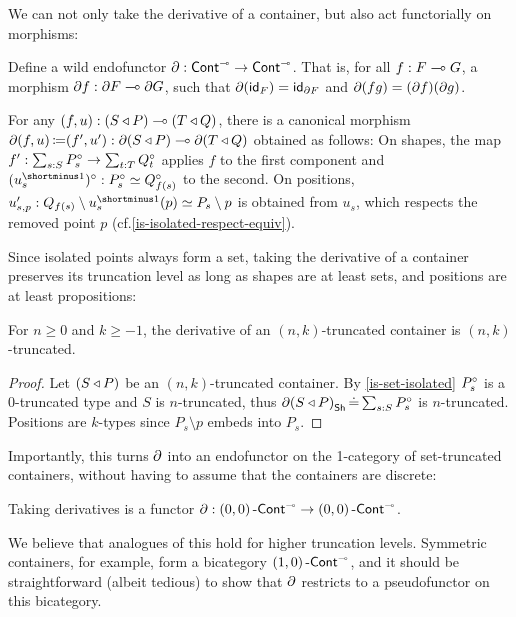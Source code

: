 We can not only take the derivative of a container, but also act functorially on morphisms:
\begin{problem}
  Define a wild endofunctor \( \partial : \operatorname{\operatorname{\mathsf{Cont}}}^{{\scriptscriptstyle\multimap}} \to \operatorname{\operatorname{\mathsf{Cont}}}^{{\scriptscriptstyle\multimap}} \).
  That is,
  for all \( f : F\mathrel{\multimap}G \), a morphism \( \partial{f} : \partial{F}\mathrel{\multimap}\partial{G} \),
  such that \( \partial(\operatorname{\mathsf{id}}_F) = \operatorname{\mathsf{id}}_{\partial{F}} \) and \(\partial(fg) = (\partial{f})(\partial{g}) \).
  \begin{construction}
    For any \( (f, u) : (S\mathbin{\triangleleft}P)\mathrel{\multimap}(T\mathbin{\triangleleft}Q) \),
    there is a canonical morphism \( \partial{(f, u)} \operatorname{\mathrel{\coloneq}} (f' , u') : \partial{(S\mathbin{\triangleleft}P)}\mathrel{\multimap}\partial{(T\mathbin{\triangleleft}Q)} \)
    obtained as follows:
    On shapes, the map \( f' : \sum_{s : S} P_s^{\circ} \to \sum_{t : T} Q_t^{\circ} \)
    applies \( f \) to the first component and \( \Isolated{(u_s^\Inv)} : \Isolated{P_s} \simeq \Isolated{Q_{f(s)}} \) to the second.
    On positions, \( u'_{s,p} : Q_{f(s)} \setminus u_s^\Inv(p) \simeq P_s \setminus p \) is obtained from \( u_s \), which respects the removed point \( p \)
    (cf.\@ \autoref{is-isolated-respect-equiv}).
  \end{construction}
\end{problem}

Since isolated points always form a set, taking the derivative of a container preserves its truncation level
as long as shapes are at least sets, and positions are at least propositions:
\begin{proposition}
  For \( n \geq 0 \) and \( k \geq -1 \), the derivative of an \( (n, k) \)-truncated container is \( (n, k) \)-truncated.
  \begin{proof}
    Let \( (S\mathbin{\triangleleft}P) \) be an \( (n, k) \)-truncated container.
    By \autoref{is-set-isolated} \( P_s^{\circ} \) is a 0-truncated type and \( S \) is \( n \)-truncated,
    thus \( \partial{(S\mathbin{\triangleleft}P)}_{\operatorname{\mathsf{Sh}}} \operatorname{\mathrel{\doteq}} \sum_{s : S} P_s^{\circ} \) is \( n \)-truncated.
    Positions are \( k \)-types since \( P_s \setminus p \) embeds into \( P_s \).
  \end{proof}
\end{proposition}

Importantly, this turns \( \partial \) into an endofunctor on the 1-category of set-truncated containers,
without having to assume that the containers are discrete:
\begin{corollary}
  Taking derivatives is a functor \( \partial : (0,0)\operatorname{\mathsf{-Cont}}^{{\scriptscriptstyle\multimap}} \to (0,0)\operatorname{\mathsf{-Cont}}^{{\scriptscriptstyle\multimap}} \).
\end{corollary}
We believe that analogues of this hold for higher truncation levels.
Symmetric containers, for example, form a bicategory \( (1,0)\operatorname{\mathsf{-Cont}}^{{\scriptscriptstyle\multimap}} \),
and it should be straightforward (albeit tedious) to show that \( \partial \) restricts to a pseudo\-functor on this bicategory.

